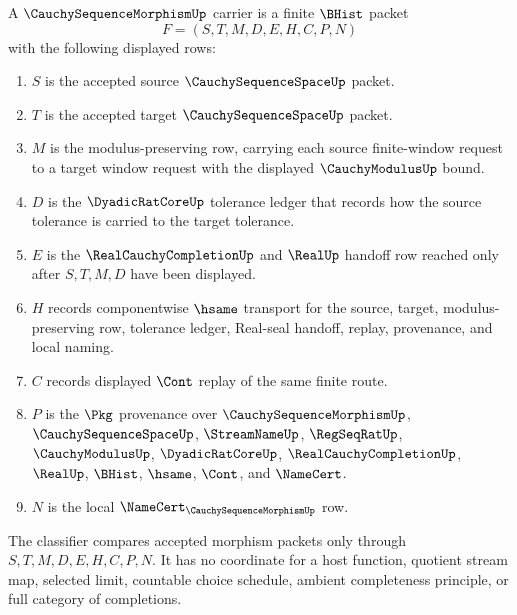 \begin{definition}
\label{def:cauchy-sequence-morphism-carrier}
A $\CauchySequenceMorphismUp$ carrier is a finite $\BHist$ packet
$$
F=(S,T,M,D,E,H,C,P,N)
$$
with the following displayed rows:
\begin{enumerate}
\item $S$ is the accepted source $\CauchySequenceSpaceUp$ packet.
\item $T$ is the accepted target $\CauchySequenceSpaceUp$ packet.
\item $M$ is the modulus-preserving row, carrying each source finite-window request to a target window request with the displayed $\CauchyModulusUp$ bound.
\item $D$ is the $\DyadicRatCoreUp$ tolerance ledger that records how the source tolerance is carried to the target tolerance.
\item $E$ is the $\RealCauchyCompletionUp$ and $\RealUp$ handoff row reached only after $S,T,M,D$ have been displayed.
\item $H$ records componentwise $\hsame$ transport for the source, target, modulus-preserving row, tolerance ledger, Real-seal handoff, replay, provenance, and local naming.
\item $C$ records displayed $\Cont$ replay of the same finite route.
\item $P$ is the $\Pkg$ provenance over $\CauchySequenceMorphismUp$, $\CauchySequenceSpaceUp$, $\StreamNameUp$, $\RegSeqRatUp$, $\CauchyModulusUp$, $\DyadicRatCoreUp$, $\RealCauchyCompletionUp$, $\RealUp$, $\BHist$, $\hsame$, $\Cont$, and $\NameCert$.
\item $N$ is the local $\NameCert_{\CauchySequenceMorphismUp}$ row.
\end{enumerate}
The classifier compares accepted morphism packets only through $S,T,M,D,E,H,C,P,N$. It has no coordinate for a host function, quotient stream map, selected limit, countable choice schedule, ambient completeness principle, or full category of completions.
\end{definition}

